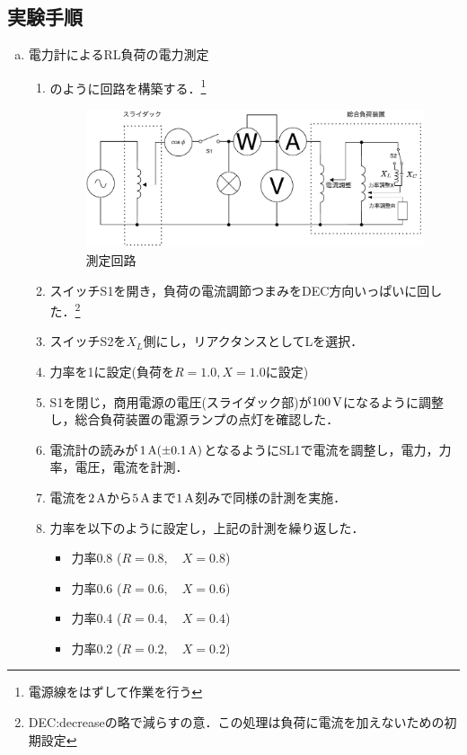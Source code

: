 \subsection{実験手順}
\begin{enumerate}[a)]
\item 電力計によるRL負荷の電力測定
\label{RLhuka}
\begin{enumerate}[(1)]
	\item {}のように回路を構築する．\footnote{電源線をはずして作業を行う}
	\begin{figure}[h]
	\centering
	\includegraphics[scale=1]{./fig/circ.pdf}
	\caption{測定回路}
	\label{fig:circ}
\end{figure}
\item スイッチS1を開き，負荷の電流調節つまみをDEC方向いっぱいに回した．\footnote{DEC:decreaseの略で減らすの意．この処理は負荷に電流を加えないための初期設定}
\item スイッチS2を$X_{L}$側にし，リアクタンスとしてLを選択．\label{S2}
\item 力率を1に設定(負荷を$R=1.0, X=1.0$に設定)
\item S1を閉じ，商用電源の電圧(スライダック部)が$100\,\rm{V}$になるように調整し，総合負荷装置の電源ランプの点灯を確認した．
\item 電流計の読みが$1\,\rm{A}(\pm 0.1\,\rm{A})$となるようにSL1で電流を調整し，電力，力率，電圧，電流を計測．
\item 電流を$2\,\rm{A}$から$5\,\rm{A}$まで$1\,\rm{A}$刻みで同様の計測を実施．
\item 力率を以下のように設定し，上記の計測を繰り返した．
\begin{itemize}
	\item 力率0.8 ($R=0.8,\quad X=0.8$)
	\item 力率0.6 ($R=0.6,\quad X=0.6$)
	\item 力率0.4 ($R=0.4,\quad X=0.4$)
	\item 力率0.2 ($R=0.2,\quad X=0.2$)
\end{itemize}

\end{enumerate}
\end{enumerate}
